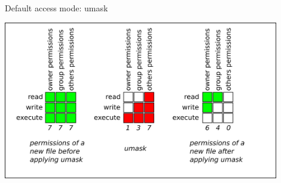 \begin{frame}[fragile]{Default access mode: umask}

\includegraphics[width=0.9\textwidth]{../../slides/cmdline/clipart/Users_Groups-Umask_Example.png}

\end{frame}
